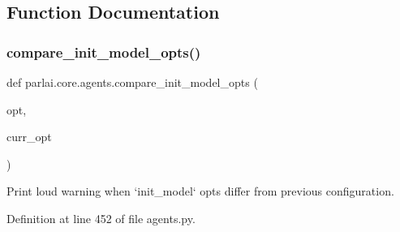 \subsection{Function Documentation}
\mbox{\label{namespaceparlai_1_1core_1_1agents_a7eb0ec391b94a2adc51acdf8d2a35a68}} 
\subsubsection{\texorpdfstring{compare\+\_\+init\+\_\+model\+\_\+opts()}{compare\_init\_model\_opts()}}
{\footnotesize\ttfamily def parlai.\+core.\+agents.\+compare\+\_\+init\+\_\+model\+\_\+opts (\begin{DoxyParamCaption}\item[{}]{opt,  }\item[{}]{curr\+\_\+opt }\end{DoxyParamCaption})}

\begin{DoxyVerb}Print loud warning when `init_model` opts differ from previous configuration.
\end{DoxyVerb}
 

Definition at line 452 of file agents.\+py.



